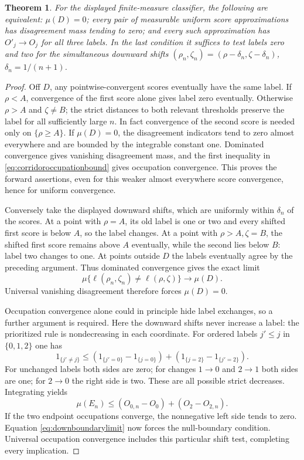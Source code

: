 \documentclass[11pt]{article}
\newtheorem{theorem}{Theorem}[section]
\begin{document}
\begin{theorem}\label{thm:corridorstability}
For the displayed finite-measure classifier, the following are
equivalent: $\mu(D)=0$; every pair of measurable uniform score
approximations has disagreement mass tending to zero; and every
such approximation has $O'_j\to O_j$ for all three labels.
In the last condition it suffices to test labels zero and two for
the simultaneous downward shifts
$(\rho_n,\zeta_n)=(\rho-\delta_n,\zeta-\delta_n)$,
$\delta_n=1/(n+1)$.
\end{theorem}
\begin{proof}
Off $D$, any pointwise-convergent scores eventually have the same
label. If $\rho<A$, convergence of the first score alone gives
label zero eventually. Otherwise $\rho>A$ and $\zeta\ne B$;
the strict distances to both relevant thresholds preserve the
label for all sufficiently large $n$. In fact convergence of the
second score is needed only on $\{\rho\geq A\}$. If $\mu(D)=0$,
the disagreement indicators tend to zero almost everywhere and
are bounded by the integrable constant one. Dominated convergence
gives vanishing disagreement mass, and the first inequality in
\eqref{eq:corridoroccupationbound} gives occupation convergence.
This proves the forward assertions, even for this weaker almost
everywhere score convergence, hence for uniform convergence.

Conversely take the displayed downward shifts, which are uniformly
within $\delta_n$ of the scores. At a point with $\rho=A$, its
old label is one or two and every shifted first score is below
$A$, so the label changes. At a point with $\rho>A,\zeta=B$,
the shifted first score remains above $A$ eventually, while the
second lies below $B$: label two changes to one. At points outside
$D$ the labels eventually agree by the preceding argument.
Thus dominated convergence gives the exact limit
\begin{equation}\label{eq:downboundarylimit}
 \mu\{\ell(\rho_n,\zeta_n)\ne\ell(\rho,\zeta)\}
       \longrightarrow\mu(D).
\end{equation}
Universal vanishing disagreement therefore forces $\mu(D)=0$.

Occupation convergence alone could in principle hide label exchanges,
so a further argument is required. Here the downward shifts never
increase a label: the prioritized rule is nondecreasing in each
coordinate. For ordered labels $j'\leq j$ in $\{0,1,2\}$ one has
\[
 1_{\{j'\ne j\}}\leq
 (1_{\{j'=0\}}-1_{\{j=0\}})
 +(1_{\{j=2\}}-1_{\{j'=2\}}).
\]
For unchanged labels both sides are zero; for changes $1\to0$
and $2\to1$ both sides are one; for $2\to0$ the right side is
two. These are all possible strict decreases. Integrating yields
\[
 \mu(E_n)\leq(O_{0,n}-O_0)+(O_2-O_{2,n}).
\]
If the two endpoint occupations converge, the nonnegative left
side tends to zero. Equation \eqref{eq:downboundarylimit} now
forces the null-boundary condition. Universal occupation convergence
includes this particular shift test, completing every implication.
\end{proof}
\end{document}
